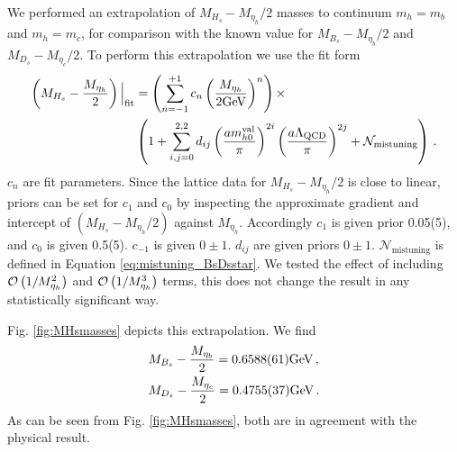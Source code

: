 We performed an extrapolation of $M_{H_s}-M_{\eta_h}/2$ masses to continuum $m_h=m_b$ and $m_h=m_c$, for comparison with the known value for $M_{B_s}-M_{\eta_b}/2$ and $M_{D_s}-M_{\eta_c}/2$. To perform this extrapolation we use the fit form
\begin{align}
  \left(M_{H_s}-{M_{\eta_h}\over2}\right)\Big|_{\text{fit}}& =
  \left( \sum_{n=-1}^{+1} c_n \left({M_{\eta_h}\over 2\text{GeV}}\right)^n\right) \times
  \\ &\left( 1 + \sum_{i,j=0}^{2,2} d_{ij} \left({ am_{h0}^{\text{val}} \over \pi }\right)^{2i} \left({ a\Lambda_{\text{QCD}} \over \pi }\right)^{2j} + \mathcal{N}_{\text{mistuning}} \right)\,.
    \nonumber
\end{align}
$c_n$ are fit parameters. Since the lattice data for $M_{H_s}-M_{\eta_h}/2$ is close to linear, priors can be set for $c_{1}$ and $c_0$ by inspecting the approximate gradient and intercept of $\left(M_{H_s}-{M_{\eta_h}/2}\right)$ against $M_{\eta_h}$. Accordingly $c_{1}$ is given prior 0.05(5), and $c_0$ is given 0.5(5). $c_{-1}$ is given $0\pm 1$. $d_{ij}$ are given priors $0\pm 1$.  $\mathcal{N}_{\text{mistuning}}$ is defined in Equation \eqref{eq:mistuning_BsDsstar}. We tested the effect of including $\mathcal{O}\left( 1/M_{\eta_h}^2 \right)$ and $\mathcal{O}\left( 1/M_{\eta_h}^3 \right)$ terms, this does not change the result in any statistically significant way.

Fig. \ref{fig:MHsmasses} depicts this extrapolation. We find
\begin{align}
  &M_{B_s} - {M_{\eta_b}\over 2} =  0.6588(61) \text{GeV}\,, \\
  &M_{D_s} - {M_{\eta_c}\over 2} =  0.4755(37)  \text{GeV}\,.
\end{align}
As can be seen from Fig. \ref{fig:MHsmasses}, both are in agreement with the physical result.

